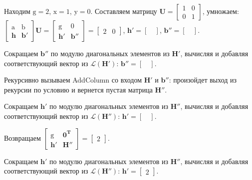 \begin{enumerate}
\begin{itemize}
Находим $ \mathrm{g} = 2 $, $ \mathrm{x} = 1 $, $ \mathrm{y} = 0 $. Составляем матрицу $  \mathbf{U} = \left[\begin{array}{cccc}
1 & 0 \\
0 & 1
\end{array}\right] $, умножаем: $ \left[ \begin{array}{cccc}
\mathrm{a} & \mathrm{b} \\
\mathbf{h} & \mathbf{b}' \end{array} \right] \mathbf{U}=
\left[ \begin{array}{cccc}
\mathrm{g} & \mathrm{0} \\
\mathbf{h}' & \mathbf{b}'' \end{array} \right] = \left[\begin{array}{cccc}
2 & 0
\end{array}\right] $, $ \mathbf{h}' = \left[\begin{array}{cccc}
\ \end{array}\right] $, $ \mathbf{b}'' = \left[\begin{array}{cccc}
\ \end{array}\right] $.

Сокращаем $ \mathbf{b}'' $ по модулю диагональных элементов из $ \mathbf{H}' $, вычисляя и добавляя соответствующий вектор из $ \mathcal{L}(\mathbf{H}') $: $ \mathbf{b}'' = \left[ \begin{array}{cccc}
\ \end{array}\right] $.

Рекурсивно вызываем AddColumn со входом $ \mathbf{H}' $ и $ \mathbf{b}'' $: произойдет выход из рекурсии по условию и вернется пустая матрица $ \mathbf{H}'' $.

Сокращаем $ \mathbf{h}' $ по модулю диагональных элементов из $ \mathbf{H}'' $, вычисляя и добавляя соответствующий вектор из $ \mathcal{L}(\mathbf{H}'') $: $ \mathbf{h}' = \left[ \begin{array}{cccc}
\ \end{array}\right] $.

Возвращаем $ \left[\begin{array}{cccc}
\mathrm{g} & \mathbf{0}^\mathbf{T} \\
\mathbf{h}' & \mathbf{H}''
\end{array}\right] = \left[\begin{array}{cccc}
2
\end{array}\right] $.
\end{itemize}

Сокращаем $ \mathbf{h}' $ по модулю диагональных элементов из $ \mathbf{H}'' $, вычисляя и добавляя соответствующий вектор из $ \mathcal{L}(\mathbf{H}'') $: $ \mathbf{h}' = \left[ \begin{array}{cccc}
2
\end{array}\right] $.


\end{enumerate}
